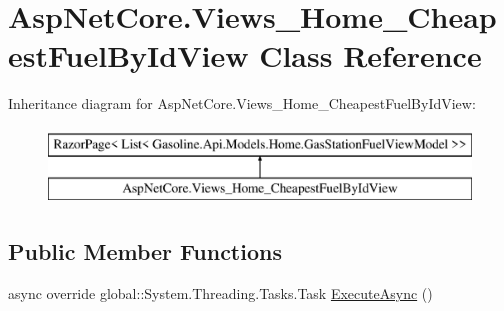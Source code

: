 \hypertarget{class_asp_net_core_1_1_views___home___cheapest_fuel_by_id_view}{}\section{Asp\+Net\+Core.\+Views\+\_\+\+Home\+\_\+\+Cheapest\+Fuel\+By\+Id\+View Class Reference}
\label{class_asp_net_core_1_1_views___home___cheapest_fuel_by_id_view}
Inheritance diagram for Asp\+Net\+Core.\+Views\+\_\+\+Home\+\_\+\+Cheapest\+Fuel\+By\+Id\+View\+:\begin{figure}[H]
\begin{center}
\leavevmode
\includegraphics[height=2.000000cm]{class_asp_net_core_1_1_views___home___cheapest_fuel_by_id_view}
\end{center}
\end{figure}
\subsection*{Public Member Functions}
\begin{DoxyCompactItemize}
\item 
async override global\+::\+System.\+Threading.\+Tasks.\+Task \mbox{\hyperlink{class_asp_net_core_1_1_views___home___cheapest_fuel_by_id_view_a963ea09ddc016177ffb913beb302e5c6}{Execute\+Async}} ()
\end{DoxyCompactItemize}
